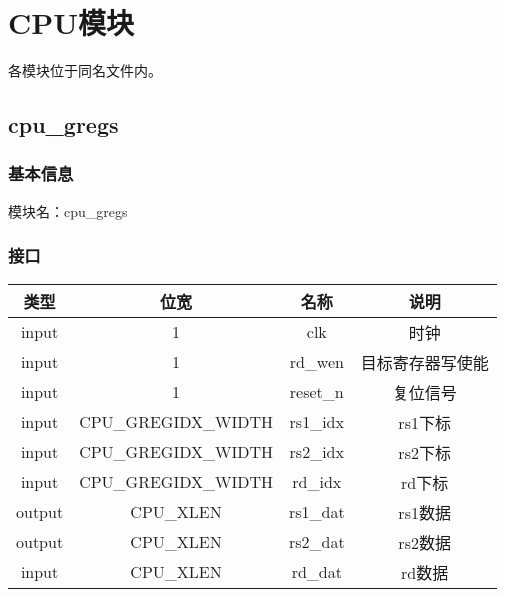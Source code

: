 %
%
%
%
%
%
%
%

\chapter{CPU模块}
各模块位于同名文件内。

\section{cpu\_gregs}
\subsection{基本信息}
模块名：cpu\_gregs
\subsection{接口}
\begin{tabular}{|c|c|c|c|}
    \hline
    类型    &   位宽    &   名称    &   说明\\\hline
    input   &   1   &   clk &   时钟\\\hline
    input   &   1   &   rd\_wen  &   目标寄存器写使能\\\hline
    input   &   1   &   reset\_n  &   复位信号\\\hline
    input   &   CPU\_GREGIDX\_WIDTH &   rs1\_idx    &   rs1下标\\\hline
    input   &   CPU\_GREGIDX\_WIDTH &   rs2\_idx    &   rs2下标\\\hline
    input   &   CPU\_GREGIDX\_WIDTH &   rd\_idx    &   rd下标\\\hline
    output   &   CPU\_XLEN &   rs1\_dat    &   rs1数据\\\hline
    output   &   CPU\_XLEN &   rs2\_dat    &   rs2数据\\\hline
    input   &   CPU\_XLEN &   rd\_dat    &   rd数据\\\hline
\end{tabular}
